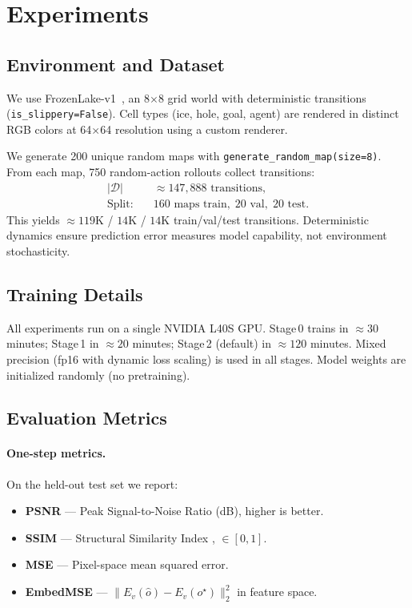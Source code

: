 \documentclass[11pt]{article}
\begin{document}
\section{Experiments}

\subsection{Environment and Dataset}

We use FrozenLake-v1~\cite{towers2024gymnasium}, an 8$\times$8 grid world
with deterministic transitions (\texttt{is\_slippery=False}).
Cell types (ice, hole, goal, agent) are rendered in distinct RGB colors
at 64$\times$64 resolution using a custom renderer.

We generate 200 unique random maps with \texttt{generate\_random\_map(size=8)}.
From each map, 750 random-action rollouts collect transitions:
\begin{align}
|\mathcal{D}| &\approx 147{,}888 \text{ transitions},\\
\text{Split:}\quad & 160 \text{ maps train},\; 20 \text{ val},\; 20 \text{ test.}
\end{align}
This yields ${\approx}119$K / $14$K / $14$K train/val/test transitions.
Deterministic dynamics ensure prediction error measures model capability,
not environment stochasticity.

\subsection{Training Details}

All experiments run on a single NVIDIA L40S GPU.
Stage\,0 trains in ${\approx}30$ minutes; Stage\,1 in ${\approx}20$ minutes;
Stage\,2 (default) in ${\approx}120$ minutes.
Mixed precision (fp16 with dynamic loss scaling) is used in all stages.
Model weights are initialized randomly (no pretraining).

\subsection{Evaluation Metrics}

\paragraph{One-step metrics.} On the held-out test set we report:
\begin{itemize}
  \item \textbf{PSNR} — Peak Signal-to-Noise Ratio (dB), higher is better.
  \item \textbf{SSIM} — Structural Similarity Index \cite{wang2004ssim}, $\in[0,1]$.
  \item \textbf{MSE} — Pixel-space mean squared error.
  \item \textbf{EmbedMSE} — $\|E_v(\hat{o}) - E_v(o^\star)\|_2^2$ in feature space.
\end{itemize}
\end{document}
